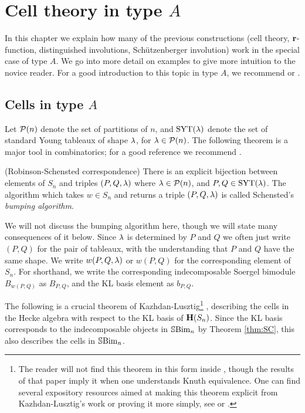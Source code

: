 

\section{Cell theory in type $A$}
\label{sec:typeAcells}

In this chapter we explain how many of the previous constructions (cell theory, $\mathbf{r}$-function, distinguished involutions, Sch\"utzenberger involution) work in the special case of type
$A$. We go into more detail on examples to give more intuition to the novice reader. For a good introduction to this topic in type $A$, we recommend \cite{ArikiCells} or \cite{GeordiePQ}.

\subsection{Cells in type $A$}
\label{subsec:cellA}

Let ${\mathcal{P}}(n)$ denote the set of partitions of $n$, and $\operatorname{SYT}(\lambda)$ denote the set of standard Young tableaux of shape $\lambda$, for $\lambda \in {\mathcal{P}}(n)$. The following theorem is a major tool in
combinatorics; for a good reference we recommend \cite{FultonTab}.

\begin{thm}(Robinson-Schensted correspondence) There is an explicit bijection between elements of $S_n$ and triples $(P,Q,\lambda)$ where $\lambda \in {\mathcal{P}}(n)$, and $P, Q \in \operatorname{SYT}(\lambda)$. The
algorithm which takes $w \in S_n$ and returns a triple $(P,Q,\lambda)$ is called Schensted's \emph{bumping algorithm}. \end{thm}

We will not discuss the bumping algorithm here, though we will state many consequences of it below. Since $\lambda$ is determined by $P$ and $Q$ we often just write $(P,Q)$ for the pair of
tableaux, with the understanding that $P$ and $Q$ have the same shape. We write $w(P,Q,\lambda)$ or $w(P,Q)$ for the corresponding element of $S_n$. For shorthand, we write the corresponding
indecomposable Soergel bimodule $B_{w(P,Q)}$ as $B_{P,Q}$, and the KL basis element as $b_{P,Q}$.

The following is a crucial theorem of Kazhdan-Lusztig\footnote{The reader will not find this theorem in this form inside \cite{KazLus79}, though the results of that paper imply it when one understands Knuth equivalence. One can find several expository resources aimed at making this theorem explicit from Kazhdan-Lusztig's work or proving it more simply, see \cite{ArikiCells} or \cite{GeordiePQ}.} \cite{KazLus79}, describing the cells in the Hecke algebra with respect to the KL basis of ${\mathbf H}(S_n)$.  Since the KL basis corresponds to the indecomposable objects in ${\mathbb{S}}{\rm Bim }_n$ by Theorem \ref{thm:SC}, this also describes the cells in ${\mathbb{S}}{\rm Bim }_n$.

